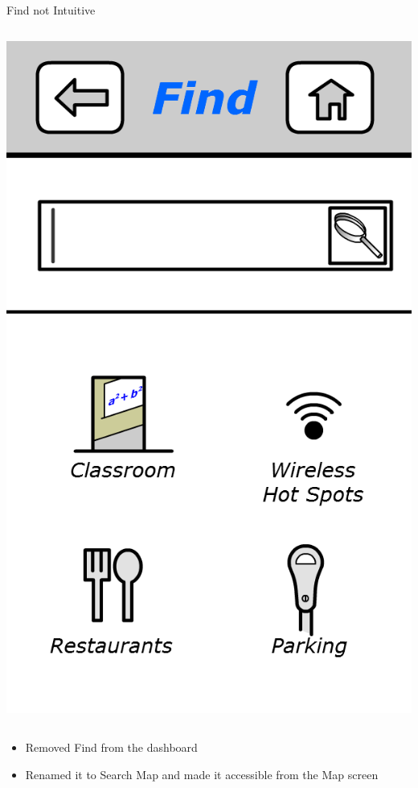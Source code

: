 \documentclass{beamer}
\begin{document}
\begin{frame}{Find not Intuitive}
\begin{columns}[c]
	    \center\includegraphics[height=0.5 \textheight]{digital/find.png}
    \end{columns}
    \begin{itemize}
        \item Removed Find from the dashboard
        \item Renamed it to Search Map and made it accessible from the Map screen
    \end{itemize}
\end{frame}
\end{document}
